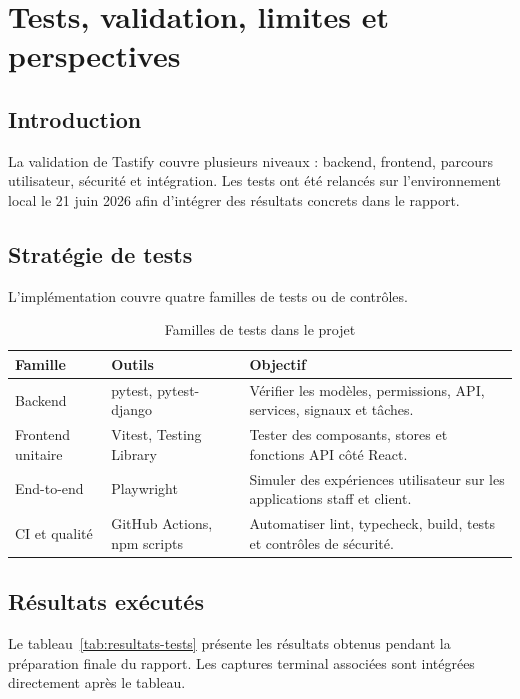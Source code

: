 \chapter{Tests, validation, limites et perspectives}
\label{chap:tests}

\section*{Introduction}
La validation de Tastify couvre plusieurs niveaux : backend, frontend, parcours utilisateur, sécurité et intégration. Les tests ont été relancés sur l'environnement local le 21 juin 2026 afin d'intégrer des résultats concrets dans le rapport.

\section{Stratégie de tests}
L'implémentation couvre quatre familles de tests ou de contrôles.

\begin{table}[H]
\centering
\caption{Familles de tests dans le projet}
\label{tab:familles-tests}
\begin{tabularx}{\textwidth}{p{3.4cm}p{4cm}Y}
\toprule
\textbf{Famille} & \textbf{Outils} & \textbf{Objectif} \\
\midrule
Backend & pytest, pytest-django & Vérifier les modèles, permissions, API, services, signaux et tâches. \\
Frontend unitaire & Vitest, Testing Library & Tester des composants, stores et fonctions API côté React. \\
End-to-end & Playwright & Simuler des expériences utilisateur sur les applications staff et client. \\
CI et qualité & GitHub Actions, npm scripts & Automatiser lint, typecheck, build, tests et contrôles de sécurité. \\
\bottomrule
\end{tabularx}
\end{table}

\section{Résultats exécutés}
Le tableau~\ref{tab:resultats-tests} présente les résultats obtenus pendant la préparation finale du rapport. Les captures terminal associées sont intégrées directement après le tableau.


